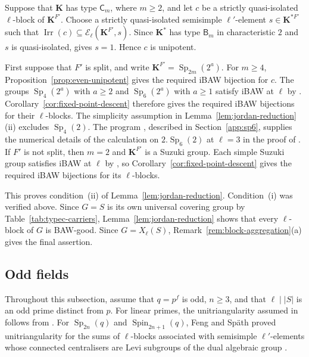 \documentclass[10pt]{amsart}
\theoremstyle{definition}
\renewcommand{\geq}{\geqslant}
\let\oldendproof\endproof
\renewenvironment{proof}[1][\proofname]{%
  \oldproof[\bfseries #1]%
}{\oldendproof}
\DeclareMathOperator{\Irr}{Irr}
\DeclareMathOperator{\Sp}{Sp}
\numberwithin{equation}{section}
\numberwithin{table}{section}
\begin{document}
\begin{proof}
Suppose that $\mathbf K$ has type $\mathsf C_m$, where $m\geq2$, and let
$c$ be a strictly quasi-isolated $\ell$-block of $\mathbf K^{F'}$.  Choose a
strictly quasi-isolated semisimple $\ell'$-element
$s\in\mathbf K^{*F'}$ such that
$\Irr(c)\subseteq\mathcal E_\ell(\mathbf K^{F'},s)$.
Since $\mathbf K^*$ has type $\mathsf B_m$ in characteristic $2$
and $s$ is quasi-isolated, \cite[Example~4.8]{Bonnafe2005} gives
$s=1$.  Hence $c$ is unipotent.

First suppose that $F'$ is split, and write
$\mathbf K^{F'}=\Sp_{2m}(2^a)$. For $m\geq4$,
Proposition~\ref{prop:even-unipotent} gives the required iBAW bijection
for $c$. The groups $\Sp_4(2^a)$ with $a\geq2$ and
$\Sp_6(2^a)$ with $a\geq1$ satisfy iBAW at $\ell$ by
\cite[Theorem~5.5]{SchaefferFry2014}.  Corollary~\ref{cor:fixed-point-descent}
therefore gives the required iBAW bijections for their $\ell$-blocks.
The simplicity assumption in Lemma~\ref{lem:jordan-reduction}\textup{(ii)}
excludes $\Sp_4(2)$.
The program , described in
Section~\ref{app:sp6}, supplies the numerical details of the
calculation on $2.\Sp_6(2)$ at $\ell=3$ in the proof of
\cite[Theorem~5.5]{SchaefferFry2014}.
If $F'$ is not split, then $m=2$ and $\mathbf K^{F'}$ is a
Suzuki group.  Each simple Suzuki group satisfies iBAW at $\ell$
by \cite[Corollary~6.3]{Spath2013}, so
Corollary~\ref{cor:fixed-point-descent} gives the required iBAW
bijections for its $\ell$-blocks.

This proves condition~\textup{(ii)} of
Lemma~\ref{lem:jordan-reduction}. Condition~\textup{(i)} was verified above.
Since $G=S$ is its own universal covering group by
Table~\ref{tab:typec-carriers}, Lemma~\ref{lem:jordan-reduction}
shows that every
$\ell$-block of $G$ is BAW-good.  Since $G=X_\ell(S)$,
Remark~\ref{rem:block-aggregation}\textup{(a)} gives the final assertion.
\end{proof}

\subsection{Odd fields}

Throughout this subsection, assume that $q=p^f$ is odd, $n\geq3$, and that
$\ell\mid |S|$ is an odd prime distinct from $p$.
For linear primes, the unitriangularity assumed in
\cite[Theorem~2]{Li2021} follows from
\cite[Theorem~8.2 and Corollary~8.7]{GruberHiss1997}.
For $\Sp_{2n}(q)$ and $\operatorname{Spin}_{2n+1}(q)$, Feng and Sp\"ath
proved unitriangularity for the sums of $\ell$-blocks associated with
semisimple $\ell'$-elements whose connected centralisers are Levi
subgroups of the dual algebraic group
\cite[Proposition~7.3]{FengSpath2023}.
\end{document}
